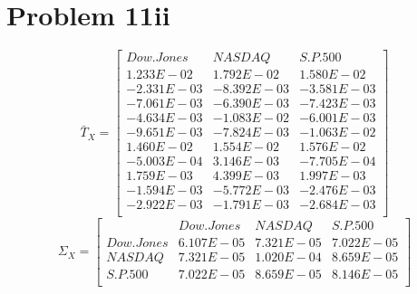\documentclass{article}
\begin{document}
\section*{Problem 11ii}
\begin{equation*}
\bar{T}_X= \begin{bmatrix}{}
 Dow.Jones & NASDAQ & S.P.500 \\ 
1.233E-02 & 1.792E-02 & 1.580E-02 \\
  -2.331E-03 & -8.392E-03 & -3.581E-03 \\
-7.061E-03 & -6.390E-03 & -7.423E-03 \\
 -4.634E-03 & -1.083E-02 & -6.001E-03 \\
 -9.651E-03 & -7.824E-03 & -1.063E-02 \\
  1.460E-02 & 1.554E-02 & 1.576E-02 \\
-5.003E-04 & 3.146E-03 & -7.705E-04 \\
  1.759E-03 & 4.399E-03 & 1.997E-03 \\
  -1.594E-03 & -5.772E-03 & -2.476E-03 \\
-2.922E-03 & -1.791E-03 & -2.684E-03 \\
\end{bmatrix}
\end{equation*}
\begin{equation*}
\Sigma_X=%
\begin{bmatrix}{}
  & Dow.Jones & NASDAQ & S.P.500 \\ 
 Dow.Jones & 6.107E-05 & 7.321E-05 & 7.022E-05 \\ 
  NASDAQ & 7.321E-05 & 1.020E-04 & 8.659E-05 \\ 
  S.P.500 & 7.022E-05 & 8.659E-05 & 8.146E-05 \\ 
  \end{bmatrix}
\end{equation*}
\end{document}
